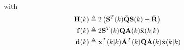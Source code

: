 \documentclass[conference]{IEEEtran} %
\begin{document}
%
%
with
\begin{align*}
	{\bf H}(k) &\triangleq 2\left({\bf S}^T(k)\bar{\bf Q}{\bf S}(k)+\bar{\bf R}\right) \\
	{\bf f}(k) &\triangleq 2{\bf S}^T(k)\bar{\bf Q}\bar{\bf A}(k)\tilde{\bf x}(k|k) \\
	{\bf d}(k) &\triangleq \tilde{\bf x}^T(k|k)\bar{\bf A}^T(k)\bar{\bf Q}\bar{\bf A}(k)\tilde{\bf x}(k|k)
\end{align*}
\end{document}
